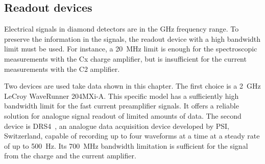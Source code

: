 \subsection{Readout devices}
\label{sec:readoutdev}
Electrical signals in diamond detectors are in the GHz frequency range. To preserve the information in the signals, the readout device with a high bandwidth limit must be used. For instance, a 20~MHz limit is enough for the spectroscopic measurements with the Cx charge amplifier, but is insufficient for the current measurements with the C2 amplifier. 

Two devices are used take data shown in this chapter. The first choice is a 2~GHz LeCroy WaveRunner 204MXi-A. This specific model has a sufficiently high bandwidth limit for the fast current preamplifier signals. It offers a reliable solution for analogue signal readout of limited amounts of data. 
The second device is DRS4~\cite{DRS4:00000}, an analogue data acquisition device developed by PSI, Switzerland, capable of recording up to four waveforms at a time at a steady rate of up to 500~Hz. Its 700~MHz bandwidth limitation is sufficient for the signal from the charge and the current amplifier.



